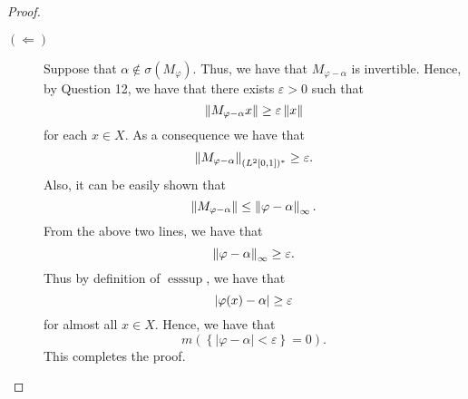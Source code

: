 \begin{proof}
\begin{description}
	\item[$\left( \Longleftarrow \right)$] Suppose that $\alpha \not\in \sigma \left( M_{\varphi} \right)$. Thus, we have that $M_{\varphi - \alpha}$ is invertible. Hence, by Question 12, we have that there exists $\varepsilon > 0$ such that 
	    \begin{equation*}
		\left\lVert M_{\varphi - \alpha}x \right\rVert \ge \varepsilon \left\lVert x \right\rVert
	    \end{equation*}
	    for each $x\in X$.
	    As a consequence we have that 
	    \begin{equation*}
		\left\lVert M_{\varphi-\alpha} \right\rVert_{(L^{2}[0,1])^{*}} \ge \varepsilon.
	    \end{equation*}
	    Also, it can be easily shown that
	    \begin{equation*}
		\left\lVert M_{\varphi - \alpha} \right\rVert \le \left\lVert \varphi-\alpha \right\rVert_{\infty}.
	    \end{equation*}
	    From the above two lines, we have that
	    \begin{equation*}
		\left\lVert \varphi -\alpha \right\rVert_{\infty} \ge \varepsilon.
	    \end{equation*}
	    Thus by definition of $\operatorname{esssup}$, we have that 
	    \begin{equation*}
		\left\lvert \varphi (x) - \alpha \right\rvert \ge \varepsilon
	    \end{equation*}
	    for almost all $x\in X$.
	    Hence, we have that 
	    \begin{equation*}
		m \left( \left\{ |\varphi - \alpha| < \varepsilon \right\} = 0 \right).
	    \end{equation*}
	    This completes the proof.
    \end{description}
\end{proof}
